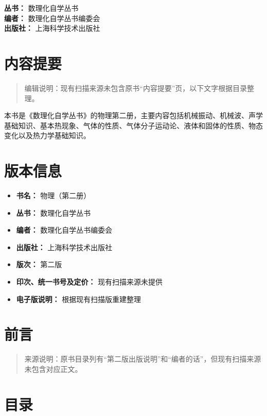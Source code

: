 \textbf{丛书：} 数理化自学丛书\\
\textbf{编者：} 数理化自学丛书编委会\\
\textbf{出版社：} 上海科学技术出版社

\chapter{内容提要}\label{ux5185ux5bb9ux63d0ux8981}

\begin{quote}
编辑说明：现有扫描来源未包含原书``内容提要''页，以下文字根据目录整理。
\end{quote}

本书是《数理化自学丛书》的物理第二册，主要内容包括机械振动、机械波、声学基础知识、基本热现象、气体的性质、气体分子运动论、液体和固体的性质、物态变化以及热力学基础知识。

\chapter{版本信息}\label{ux7248ux672cux4fe1ux606f}

\begin{itemize}
\tightlist
\item
  \textbf{书名：} 物理（第二册）
\item
  \textbf{丛书：} 数理化自学丛书
\item
  \textbf{编者：} 数理化自学丛书编委会
\item
  \textbf{出版社：} 上海科学技术出版社
\item
  \textbf{版次：} 第二版
\item
  \textbf{印次、统一书号及定价：} 现有扫描来源未提供
\item
  \textbf{电子版说明：} 根据现有扫描版重建整理
\end{itemize}

\chapter{前言}\label{ux524dux8a00}

\begin{quote}
来源说明：原书目录列有``第二版出版说明''和``编者的话''，但现有扫描来源未包含对应正文。
\end{quote}

\chapter{目录}\label{ux76eeux5f55}

